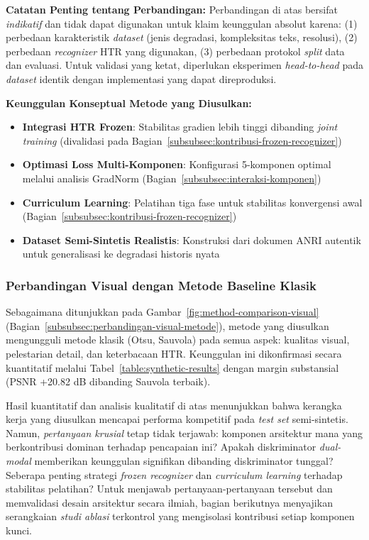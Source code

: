\documentclass[12pt,a4paper]{article}
\begin{document}
\textbf{Catatan Penting tentang Perbandingan:}
Perbandingan di atas bersifat \textit{indikatif} dan tidak dapat digunakan untuk klaim keunggulan absolut karena: (1) perbedaan karakteristik \textit{dataset} (jenis degradasi, kompleksitas teks, resolusi), (2) perbedaan \textit{recognizer} HTR yang digunakan, (3) perbedaan protokol \textit{split} data dan evaluasi. Untuk validasi yang ketat, diperlukan eksperimen \textit{head-to-head} pada \textit{dataset} identik dengan implementasi yang dapat direproduksi.

\textbf{Keunggulan Konseptual Metode yang Diusulkan:}
\begin{itemize}[nosep]
    \item \textbf{Integrasi HTR Frozen}: Stabilitas gradien lebih tinggi dibanding \textit{joint training} (divalidasi pada Bagian~\ref{subsubsec:kontribusi-frozen-recognizer})
    \item \textbf{Optimasi Loss Multi-Komponen}: Konfigurasi 5-komponen optimal melalui analisis GradNorm (Bagian~\ref{subsubsec:interaksi-komponen})
    \item \textbf{Curriculum Learning}: Pelatihan tiga fase untuk stabilitas konvergensi awal (Bagian~\ref{subsubsec:kontribusi-frozen-recognizer})
    \item \textbf{Dataset Semi-Sintetis Realistis}: Konstruksi dari dokumen ANRI autentik untuk generalisasi ke degradasi historis nyata
\end{itemize}

\vspace{0.8em}

\subsubsection{Perbandingan Visual dengan Metode Baseline Klasik}
\label{subsubsec:perbandingan-visual-baseline}

Sebagaimana ditunjukkan pada Gambar~\ref{fig:method-comparison-visual} (Bagian~\ref{subsubsec:perbandingan-visual-metode}), metode yang diusulkan mengungguli metode klasik (Otsu, Sauvola) pada semua aspek: kualitas visual, pelestarian detail, dan keterbacaan HTR. Keunggulan ini dikonfirmasi secara kuantitatif melalui Tabel~\ref{table:synthetic-results} dengan margin substansial (PSNR +20.82 dB dibanding Sauvola terbaik).

\vspace{0.5em}

\noindent
Hasil kuantitatif dan analisis kualitatif di atas menunjukkan bahwa kerangka kerja yang diusulkan mencapai performa kompetitif pada \textit{test set} semi-sintetis. Namun, \textit{pertanyaan krusial} tetap tidak terjawab: komponen arsitektur mana yang berkontribusi dominan terhadap pencapaian ini? Apakah diskriminator \textit{dual-modal} memberikan keunggulan signifikan dibanding diskriminator tunggal? Seberapa penting strategi \textit{frozen recognizer} dan \textit{curriculum learning} terhadap stabilitas pelatihan? Untuk menjawab pertanyaan-pertanyaan tersebut dan memvalidasi desain arsitektur secara ilmiah, bagian berikutnya menyajikan serangkaian \textit{studi ablasi} terkontrol yang mengisolasi kontribusi setiap komponen kunci.
\end{document}
